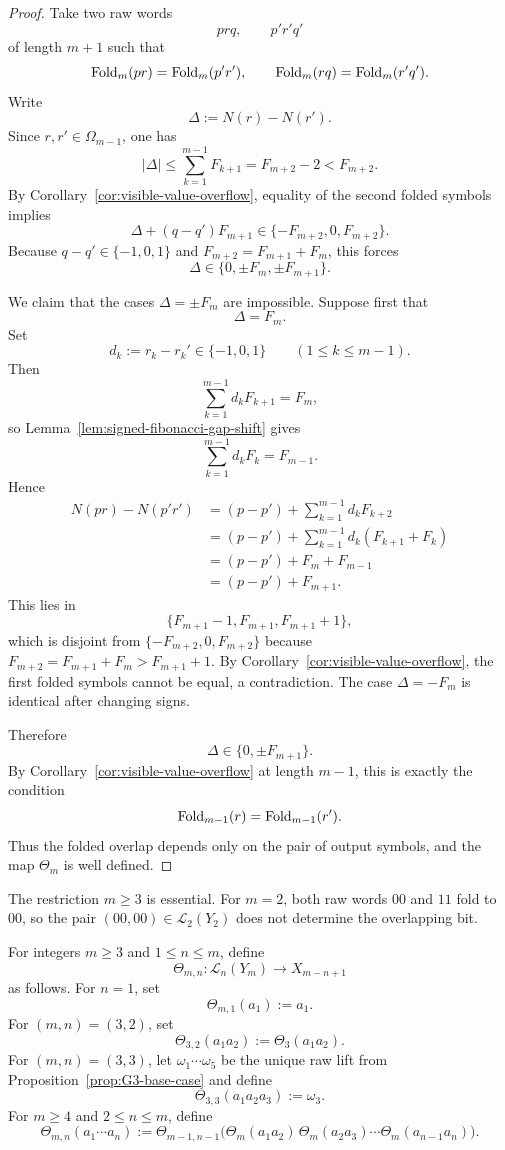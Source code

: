 \begin{proof}
Take two raw words
\[
prq,\qquad p'r'q'
\]
of length $m+1$ such that
\[
\operatorname{Fold}_m(pr)=\operatorname{Fold}_m(p'r'),
\qquad
\operatorname{Fold}_m(rq)=\operatorname{Fold}_m(r'q').
\]
Write
\[
\Delta:=N(r)-N(r').
\]
Since $r,r'\in\Omega_{m-1}$, one has
\[
|\Delta|\le \sum_{k=1}^{m-1}F_{k+1}=F_{m+2}-2<F_{m+2}.
\]
By Corollary~\ref{cor:visible-value-overflow}, equality of the second folded
symbols implies
\[
\Delta+(q-q')F_{m+1}\in\{-F_{m+2},0,F_{m+2}\}.
\]
Because $q-q'\in\{-1,0,1\}$ and $F_{m+2}=F_{m+1}+F_m$, this forces
\[
\Delta\in\{0,\pm F_m,\pm F_{m+1}\}.
\]

We claim that the cases $\Delta=\pm F_m$ are impossible.  Suppose first that
\[
\Delta=F_m.
\]
Set
\[
d_k:=r_k-r_k'\in\{-1,0,1\}
\qquad (1\le k\le m-1).
\]
Then
\[
\sum_{k=1}^{m-1} d_kF_{k+1}=F_m,
\]
so Lemma~\ref{lem:signed-fibonacci-gap-shift} gives
\[
\sum_{k=1}^{m-1} d_kF_k=F_{m-1}.
\]
Hence
\[
\begin{aligned}
N(pr)-N(p'r')
&=
(p-p')+\sum_{k=1}^{m-1} d_kF_{k+2}\\
&=
(p-p')+\sum_{k=1}^{m-1} d_k(F_{k+1}+F_k)\\
&=
(p-p')+F_m+F_{m-1}\\
&=
(p-p')+F_{m+1}.
\end{aligned}
\]
This lies in
\[
\{F_{m+1}-1,F_{m+1},F_{m+1}+1\},
\]
which is disjoint from $\{-F_{m+2},0,F_{m+2}\}$ because
$F_{m+2}=F_{m+1}+F_m>F_{m+1}+1$.  By
Corollary~\ref{cor:visible-value-overflow}, the first folded symbols cannot be
equal, a contradiction.  The case $\Delta=-F_m$ is identical after changing
signs.

Therefore
\[
\Delta\in\{0,\pm F_{m+1}\}.
\]
By Corollary~\ref{cor:visible-value-overflow} at length $m-1$, this is exactly
the condition
\[
\operatorname{Fold}_{m-1}(r)=\operatorname{Fold}_{m-1}(r').
\]
Thus the folded overlap depends only on the pair of output symbols, and the map
$\Theta_m$ is well defined.
\end{proof}

\begin{remark}
The restriction $m\ge 3$ is essential.  For $m=2$, both raw words $00$ and
$11$ fold to $00$, so the pair $(00,00)\in\mathcal L_2(Y_2)$ does not
determine the overlapping bit.
\end{remark}

\begin{definition}
\label{def:recursive-overlap-decoder}
For integers $m\ge 3$ and $1\le n\le m$, define
\[
\Theta_{m,n}:\mathcal L_n(Y_m)\to X_{m-n+1}
\]
as follows.  For $n=1$, set
\[
\Theta_{m,1}(a_1):=a_1.
\]
For $(m,n)=(3,2)$, set
\[
\Theta_{3,2}(a_1a_2):=\Theta_3(a_1a_2).
\]
For $(m,n)=(3,3)$, let $\omega_1\cdots\omega_5$ be the unique raw lift from
Proposition~\ref{prop:G3-base-case} and define
\[
\Theta_{3,3}(a_1a_2a_3):=\omega_3.
\]
For $m\ge 4$ and $2\le n\le m$, define
\[
\Theta_{m,n}(a_1\cdots a_n)
:=
\Theta_{m-1,n-1}\bigl(
\Theta_m(a_1a_2)\,
\Theta_m(a_2a_3)\cdots
\Theta_m(a_{n-1}a_n)
\bigr).
\]
\end{definition}

